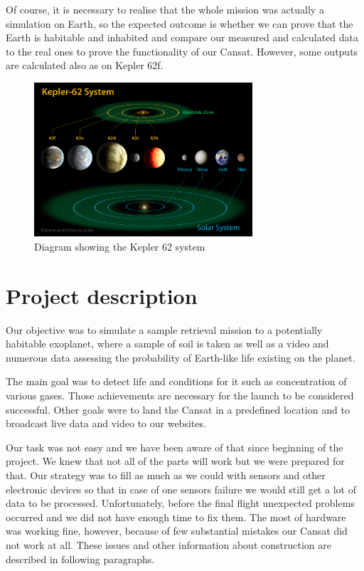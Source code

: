 \documentclass{cfp}
\begin{document}
\par Of course, it is necessary to realise that the whole mission was actually a simulation on Earth, so the expected outcome is whether we can prove that the Earth is habitable and inhabited and compare our measured and calculated data to the real ones to prove the functionality of our Cansat. However, some outputs are calculated also as on Kepler 62f.
\begin{figure}[!h]
\centering
\caption{Diagram showing the Kepler 62 system}
\includegraphics[width=230pt]{Kepler62f.jpg}
\end{figure}
\section{Project description}
\par Our objective was to simulate a sample retrieval mission to a potentially habitable exoplanet, where a sample of soil is taken as well as a video and numerous data assessing the probability of Earth-like life existing on the planet.
\par The main goal was to detect life and conditions for it such as concentration of various gases. Those achievements are necessary for the launch to be considered successful. Other goals were to land the Cansat in a predefined location and to broadcast live data and video to our websites. \cite{Websites}
\par Our task was not easy and we have been aware of that since beginning of the project. We knew that not all of the parts will work but we were prepared for that. Our strategy was to fill as much as we could with sensors and other electronic devices so that in case of one sensors failure we would still get a lot of data to be processed. Unfortunately, before the final flight unexpected problems occurred and we did not have enough time to fix them. The most of hardware was working fine, however, because of few substantial mistakes our Cansat did not work at all. These issues and other information about construction are described in following paragraphs.
\end{document}
